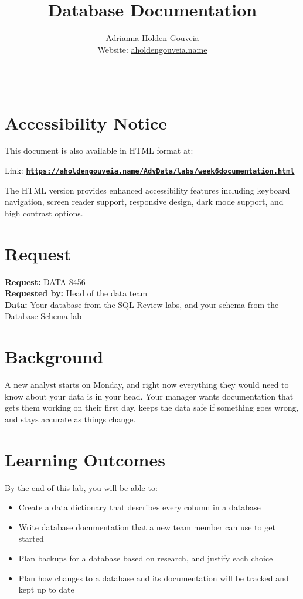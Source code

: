 \documentclass[12pt]{article}
\title{Database Documentation}
\author{
        Adrianna Holden-Gouveia \\
        Website: \href{https://aholdengouveia.name}{aholdengouveia.name}\\ 
        \date{\vspace{-5ex}}
        \faGithub {: aholdengouveia} \\
        }
\begin{document}
    

\maketitle



\section*{Accessibility Notice}
This document is also available in HTML format at:

Link: \href{https://aholdengouveia.name/AdvData/labs/week6documentation.html}{\textbf{\nolinkurl{https://aholdengouveia.name/AdvData/labs/week6documentation.html}}}

The HTML version provides enhanced accessibility features including keyboard navigation, screen reader support, responsive design, dark mode support, and high contrast options.

\section*{Request}
\noindent\textbf{Request:} DATA-8456\\
\textbf{Requested by:} Head of the data team\\
\textbf{Data:} Your database from the SQL Review labs, and your schema from the Database Schema lab

\section*{Background}
A new analyst starts on Monday, and right now everything they would need to know about your data is in your head. Your manager wants documentation that gets them working on their first day, keeps the data safe if something goes wrong, and stays accurate as things change.

\section*{Learning Outcomes}
By the end of this lab, you will be able to:
\begin{itemize}
    \item Create a data dictionary that describes every column in a database
    \item Write database documentation that a new team member can use to get started
    \item Plan backups for a database based on research, and justify each choice
    \item Plan how changes to a database and its documentation will be tracked and kept up to date
\end{itemize}
\end{document}
